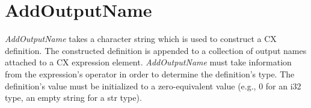 \section{AddOutputName}
\label{addoutputname}

\textit{AddOutputName} takes a character string which is used to construct a CX
definition. The constructed definition is appended to a collection of output
names attached to a CX expression element. \textit{AddOutputName} must take
information from the expression's operator in order to determine the
definition's type. The definition's value must be initialized to a
zero-equivalent value (e.g., 0 for an i32 type, an empty string for a str type).


